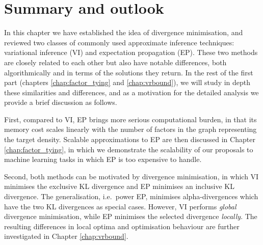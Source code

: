 \section{Summary and outlook}

In this chapter we have established the idea of divergence minimisation, and reviewed two classes of commonly used approximate inference techniques: variational inference (VI) and expectation propagation (EP). These two methods are closely related to each other but also have notable differences, both algorithmically and in terms of the solutions they return. In the rest of the first part (chapters \ref{chap:factor_tying} and \ref{chap:vrbound}), we will study in depth these similarities and differences, and as a motivation for the detailed analysis we provide a brief discussion as follows.

First, compared to VI, EP brings more serious computational burden, in that its memory cost scales linearly with the number of factors in the graph representing the target density. Scalable approximations to EP are then discussed in Chapter \ref{chap:factor_tying}, in which we demonstrate the scalability of our proposals to machine learning tasks in which EP is too expensive to handle.

Second, both methods can be motivated by divergence minimisation, in which VI minimises the exclusive KL divergence and EP minimises an inclusive KL divergence. The generalisation, i.e.~power EP, minimises alpha-divergences which have the two KL divergences as special cases. However, VI performs \emph{global} divergence minimisation, while EP minimises the selected divergence \emph{locally}. The resulting differences in local optima and optimisation behaviour are further investigated in Chapter \ref{chap:vrbound}.
